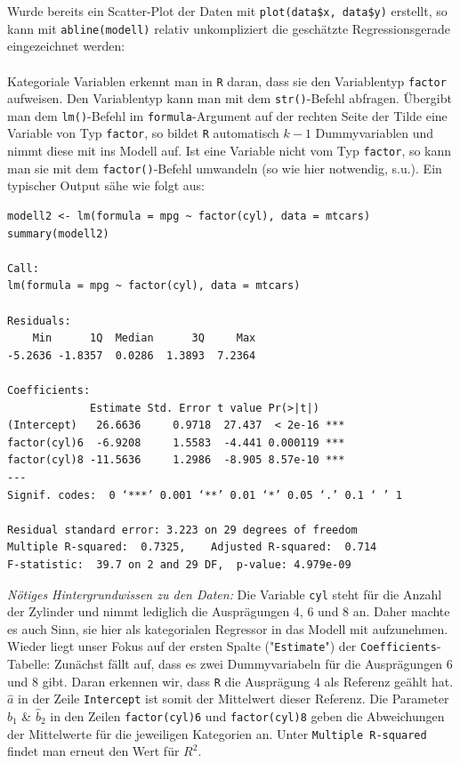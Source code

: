 \documentclass[a4paper]{article}
\newcommand\dangersign{%
 \makebox[1.8em][c]{%
 \makebox[0pt][c]{\raisebox{.15em}{\small!}}%
 \makebox[0pt][c]{\color{red}\Large$\triangle$}}}%
\begin{document}
\noindent \dangersign Wurde bereits ein Scatter-Plot der Daten mit \texttt{plot(data\$x, data\$y)} erstellt, so kann mit \texttt{abline(modell)} relativ unkompliziert die geschätzte Regressionsgerade eingezeichnet werden:\\

\noindent {}\\

\noindent \dangersign Kategoriale Variablen erkennt man in \texttt{R} daran, dass sie den Variablentyp \texttt{factor} aufweisen. Den Variablentyp kann man mit dem \texttt{str()}-Befehl abfragen. Übergibt man dem \texttt{lm()}-Befehl im \texttt{formula}-Argument auf der rechten Seite der Tilde eine Variable von Typ \texttt{factor}, so bildet \texttt{R} automatisch $k-1$ Dummyvariablen und nimmt diese mit ins Modell auf. Ist eine Variable nicht vom Typ \texttt{factor}, so kann man sie mit dem \texttt{factor()}-Befehl umwandeln (so wie hier notwendig, s.u.). Ein typischer Output sähe wie folgt aus:\\

\begin{small}
\begin{Verbatim}[frame=single]
modell2 <- lm(formula = mpg ~ factor(cyl), data = mtcars)
summary(modell2)

Call:
lm(formula = mpg ~ factor(cyl), data = mtcars)

Residuals:
    Min      1Q  Median      3Q     Max 
-5.2636 -1.8357  0.0286  1.3893  7.2364 

Coefficients:
             Estimate Std. Error t value Pr(>|t|)    
(Intercept)   26.6636     0.9718  27.437  < 2e-16 ***
factor(cyl)6  -6.9208     1.5583  -4.441 0.000119 ***
factor(cyl)8 -11.5636     1.2986  -8.905 8.57e-10 ***
---
Signif. codes:  0 ‘***’ 0.001 ‘**’ 0.01 ‘*’ 0.05 ‘.’ 0.1 ‘ ’ 1

Residual standard error: 3.223 on 29 degrees of freedom
Multiple R-squared:  0.7325,	Adjusted R-squared:  0.714 
F-statistic:  39.7 on 2 and 29 DF,  p-value: 4.979e-09
\end{Verbatim}
\end{small}
\textit{Nötiges Hintergrundwissen zu den Daten:} Die Variable \texttt{cyl} steht für die Anzahl der Zylinder und nimmt lediglich die Ausprägungen 4, 6 und 8 an. Daher machte es auch Sinn, sie hier als kategorialen Regressor in das Modell mit aufzunehmen.\\
Wieder liegt unser Fokus auf der ersten Spalte ("\texttt{Estimate}") der \texttt{Coefficients}-Tabelle: Zunächst fällt auf, dass es zwei Dummyvariabeln für die Ausprägungen 6 und 8 gibt. Daran erkennen wir, dass \texttt{R} die Ausprägung 4 als Referenz geählt hat. $\hat a$ in der Zeile \texttt{Intercept} ist somit der Mittelwert dieser Referenz. Die Parameter $\hat b_1$ \& $\hat b_2$ in den Zeilen \texttt{factor(cyl)6} und \texttt{factor(cyl)8} geben die Abweichungen der Mittelwerte für die jeweiligen Kategorien an. Unter \texttt{Multiple R-squared} findet man erneut den Wert für $R^2$.\\
\end{document}
